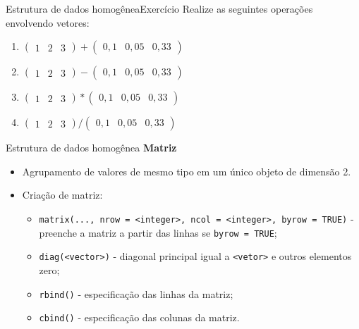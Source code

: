\documentclass[
  10pt,
  ignorenonframetext,
]{beamer}
\providecommand{\tightlist}{%
  \setlength{\itemsep}{0pt}\setlength{\parskip}{0pt}}\usepackage{longtable,booktabs,array}
\begin{document}
\begin{frame}{Estrutura de dados homogênea\newline Exercício}
\protect\hypertarget{estrutura-de-dados-homoguxeaneaexercuxedcio-1}{}
Realize as seguintes operações envolvendo vetores:

\begin{enumerate}
\tightlist
\item
  \(\begin{pmatrix} 1 & 2 & 3 \end{pmatrix} + \begin{pmatrix} 0,1 & 0,05 & 0,33 \end{pmatrix}\)
\item
  \(\begin{pmatrix} 1 & 2 & 3 \end{pmatrix} - \begin{pmatrix} 0,1 & 0,05 & 0,33 \end{pmatrix}\)
\item
  \(\begin{pmatrix} 1 & 2 & 3 \end{pmatrix} * \begin{pmatrix} 0,1 & 0,05 & 0,33 \end{pmatrix}\)
\item
  \(\begin{pmatrix} 1 & 2 & 3 \end{pmatrix} / \begin{pmatrix} 0,1 & 0,05 & 0,33 \end{pmatrix}\)
\end{enumerate}
\end{frame}

\begin{frame}[fragile]{Estrutura de dados homogênea}
\protect\hypertarget{estrutura-de-dados-homoguxeanea-6}{}
\textbf{Matriz}

\begin{itemize}
\tightlist
\item
  Agrupamento de valores de mesmo tipo em um único objeto de dimensão 2.
\item
  Criação de matriz:

  \begin{itemize}
  \tightlist
  \item
    \texttt{matrix(...,\ nrow\ =\ \textless{}integer\textgreater{},\ ncol\ =\ \textless{}integer\textgreater{},\ byrow\ =\ TRUE)}
    - preenche a matriz a partir das linhas se \texttt{byrow\ =\ TRUE};
  \item
    \texttt{diag(\textless{}vector\textgreater{})} - diagonal principal
    igual a \texttt{\textless{}vetor\textgreater{}} e outros elementos
    zero;
  \item
    \texttt{rbind()} - especificação das linhas da matriz;
  \item
    \texttt{cbind()} - especificação das colunas da matriz.
  \end{itemize}
\end{itemize}
\end{frame}
\end{document}

